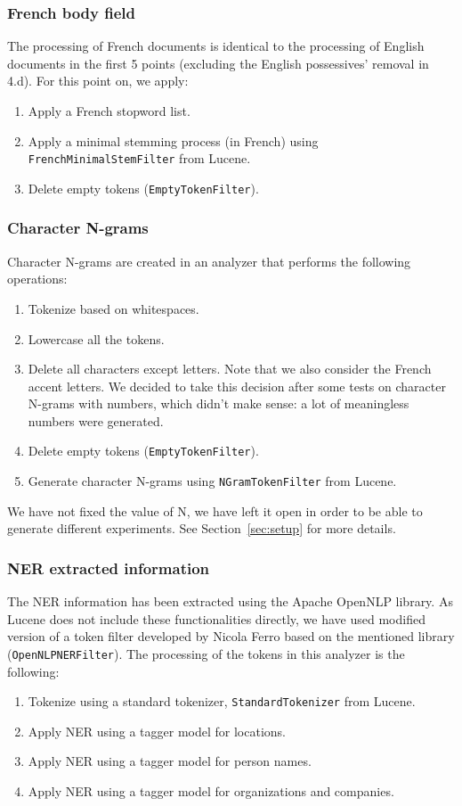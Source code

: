 \subsubsection{French body field}
The processing of French documents is identical to the processing of English documents in the first 5 points (excluding
the English possessives' removal in 4.d).
For this point on, we apply:
\begin{enumerate}[start=6]
    \item Apply a French stopword list. %
    \item Apply a minimal stemming process (in French) using \texttt{FrenchMinimalStemFilter} from Lucene.
    \item Delete empty tokens (\texttt{EmptyTokenFilter}).
\end{enumerate}

\subsubsection{Character N-grams}
Character N-grams are created in an analyzer that performs the following operations:
\begin{enumerate}
    \item Tokenize based on whitespaces.
    \item Lowercase all the tokens.
    \item Delete all characters except letters.
    Note that we also consider the French accent letters.
    We decided to take this decision after some tests on character N-grams with numbers, which didn't make sense: a lot of meaningless numbers were generated.
    \item Delete empty tokens (\texttt{EmptyTokenFilter}).
    \item Generate character N-grams using \texttt{NGramTokenFilter} from Lucene.
\end{enumerate}
We have not fixed the value of N, we have left it open in order to be able to generate different experiments.
See Section~\ref{sec:setup} for more details.

\subsubsection{NER extracted information}
The NER information has been extracted using the Apache OpenNLP %
library.
As Lucene does not include these functionalities directly, we have used modified version of a token filter developed by
Nicola Ferro based on the mentioned library (\texttt{OpenNLPNERFilter}).
The processing of the tokens in this analyzer is the following:
\begin{enumerate}
    \item Tokenize using a standard tokenizer, \texttt{StandardTokenizer} from Lucene.
    \item Apply NER using a tagger model for locations.
    \item Apply NER using a tagger model for person names.
    \item Apply NER using a tagger model for organizations and companies.
\end{enumerate}

